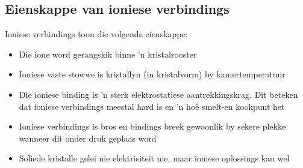             \subsection*{Eienskappe van ioniese verbindings}
            \nopagebreak
Ioniese verbindings toon die volgende eienskappe:
        \label{m38684*id142815}\begin{itemize}[noitemsep]
            \label{m38684*uid72}\item Die ione word gerangskik binne  'n kristalrooster
\label{m38684*uid73}\item Ioniese vaste stowwe is kristallyn (in kristalvorm) by kamertemperatuur
\label{m38684*uid74}\item Die ioniese binding is  'n sterk elektrostatiese aantrekkingskrag. Dit beteken dat ioniese verbindings meestal hard is en  'n ho\"{e} smelt-en kookpunt het
\label{m38684*uid75}\item Ioniese verbindings is bros en bindings breek gewoonlik by sekere plekke wanneer dit onder druk geplaas word
\label{m38684*uid76}\item Soliede kristalle gelei nie elektrisiteit nie, maar ioniese oplossings kan wel
\end{itemize}
\label{m38684*secfhsst!!!underscore!!!id522}
